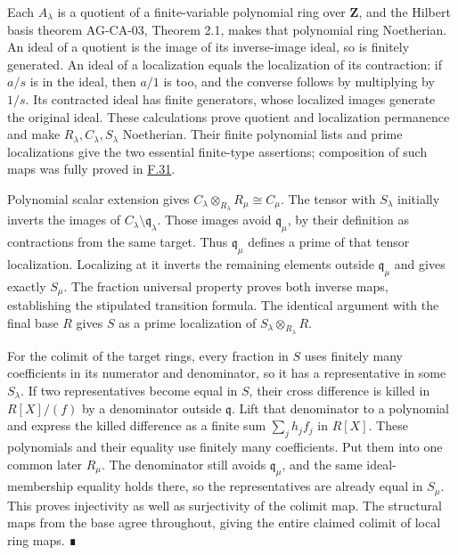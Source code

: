 \documentclass[11pt,a4paper,openany]{report}
\begin{document}
Each \(A_\lambda\) is a quotient of a finite-variable polynomial ring over \(\mathbf Z\), and the Hilbert basis theorem AG-CA-03, Theorem 2.1, makes that polynomial ring Noetherian. An ideal of a quotient is the image of its inverse-image ideal, so is finitely generated. An ideal of a localization equals the localization of its contraction: if \(a/s\) is in the ideal, then \(a/1\) is too, and the converse follows by multiplying by \(1/s\). Its contracted ideal has finite generators, whose localized images generate the original ideal. These calculations prove quotient and localization permanence and make \(R_\lambda,C_\lambda,S_\lambda\) Noetherian. Their finite polynomial lists and prime localizations give the two essential finite-type assertions; composition of such maps was fully proved in \hyperref[AG-RG-S05-algebra-lemma-composition-essentially-of-finite-type]{F.31}.

Polynomial scalar extension gives \(C_\lambda\otimes_{R_\lambda}R_\mu\cong C_\mu\). The tensor with \(S_\lambda\) initially inverts the images of \(C_\lambda\setminus\mathfrak q_\lambda\). Those images avoid \(\mathfrak q_\mu\), by their definition as contractions from the same target. Thus \(\mathfrak q_\mu\) defines a prime of that tensor localization. Localizing at it inverts the remaining elements outside \(\mathfrak q_\mu\) and gives exactly \(S_\mu\). The fraction universal property proves both inverse maps, establishing the stipulated transition formula. The identical argument with the final base \(R\) gives \(S\) as a prime localization of \(S_\lambda\otimes_{R_\lambda}R\).

For the colimit of the target rings, every fraction in \(S\) uses finitely many coefficients in its numerator and denominator, so it has a representative in some \(S_\lambda\). If two representatives become equal in \(S\), their cross difference is killed in \(R[X]/(f)\) by a denominator outside \(\mathfrak q\). Lift that denominator to a polynomial and express the killed difference as a finite sum \(\sum_jh_jf_j\) in \(R[X]\). These polynomials and their equality use finitely many coefficients. Put them into one common later \(R_\mu\). The denominator still avoids \(\mathfrak q_\mu\), and the same ideal-membership equality holds there, so the representatives are already equal in \(S_\mu\). This proves injectivity as well as surjectivity of the colimit map. The structural maps from the base agree throughout, giving the entire claimed colimit of local ring maps. ∎

\label{AG-RG-S05-algebra-lemma-limit-module-essentially-finite-presentation}
\end{document}
